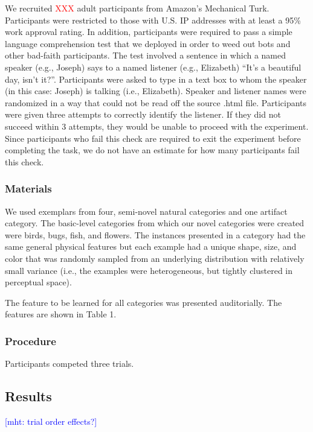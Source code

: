 \documentclass[10pt,letterpaper]{article}
\newcommand{\red}[1]{\textcolor{Red}{#1}}
\newcommand{\mht}[1]{\textcolor{Blue}{[mht: #1]}}
\begin{document}
We recruited \red{XXX} adult participants from Amazon's Mechanical Turk. 
Participants were restricted to those with U.S. IP addresses with at least a 95\% work approval rating. 
In addition, participants were required to pass a simple language comprehension test that we deployed in order to weed out bots and other bad-faith participants. 
The test involved a sentence in which a named speaker (e.g., Joseph) says to a named listener (e.g., Elizabeth) ``It's a beautiful day, isn't it?''. 
Participants were asked to type in a text box to whom the speaker (in this case: Joseph) is talking (i.e., Elizabeth).
Speaker and listener names were randomized in a way that could not be read off the source .html file.
Participants were given three attempts to correctly identify the listener. 
If they did not succeed within 3 attempts, they would be unable to proceed with the experiment.
Since participants who fail this check are required to exit the experiment before completing the task, we do not have an estimate for how many participants fail this check. 

\subsubsection{Materials}

We used exemplars from four, semi-novel natural categories and one artifact category.
The basic-level categories from which our novel categories were created were birds, bugs, fish, and flowers. 
The instances presented in a category had the same general physical features but each example had a unique shape, size, and color that was randomly sampled from an underlying distribution with relatively small variance (i.e., the examples were heterogeneous, but tightly clustered in perceptual space).

The feature to be learned for all categories was presented auditorially. 
The features are shown in Table 1. 

\subsubsection{Procedure}

Participants competed three trials. 

\subsection{Results}

\mht{trial order effects?}
\end{document}
